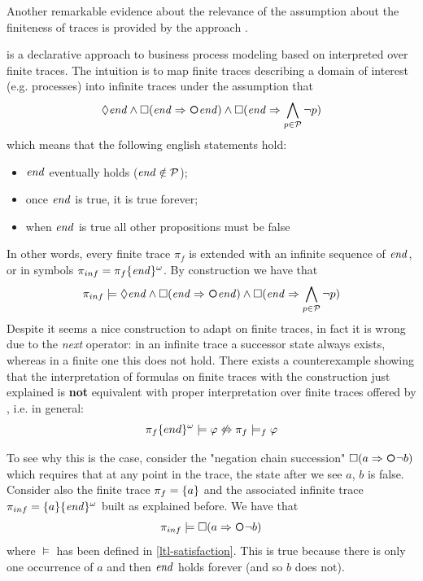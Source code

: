 \begin{example}
	Another remarkable evidence about the relevance of the assumption about the finiteness of traces is provided by the \DECLARE approach \citep{Pesic:2006:DAF:2135571.2135592}. 
	
	\DECLARE is a declarative approach to business process modeling based on \LTL interpreted over finite traces. The intuition is to map finite traces describing a domain of interest (e.g. processes) into infinite traces under the assumption that 
	\begin{equation}\label{declare-assumption}
	\Diamond \End \lAND \Box(\End \Rightarrow \Next \End) \lAND \Box (\End \Rightarrow \bigwedge_{p \in \Prop} \lnot p)
	\end{equation}
	which means that the following english statements hold:
	\begin{itemize}
		\item $\mathit{end}$ eventually holds ($\mathit{end} \notin \mathcal{P}$);
		\item once $\mathit{end}$ is true, it is true forever;
		\item when $\mathit{end}$ is true all other propositions must be false
	\end{itemize}
	In other words, every finite trace $\pi_f$ is extended with an infinite sequence of $\mathit{end}$, or in symbols $\pi_{inf} = \pi_f\{\mathit{end}\}^\omega$. By construction we have that 
	\begin{equation*}
	\pi_{inf} \models \Diamond \End \lAND \Box(\End \Rightarrow \Next \End) \lAND \Box (\End \Rightarrow \bigwedge_{p \in \Prop} \lnot p)
	\end{equation*}
	Despite it seems a nice construction to adapt \LTL on finite traces, in fact it is wrong due to the \emph{next} operator: in an infinite trace a successor state always exists, whereas in a finite one this does not hold.
	There exists a counterexample showing that the interpretation of \LTL formulas on finite traces with the construction just explained is \textbf{not} equivalent with proper interpretation over finite traces offered by \LTLf, i.e. in general:
	\begin{equation}
	\pi_f\{end\}^\omega \models \varphi \not\Leftrightarrow \pi_{f}\models_f \varphi
	\end{equation}
	
	To see why this is the case, consider the \DECLARE "negation chain succession" $\Box (a \Rightarrow \Next \lnot b)$ which requires that at any point in the trace, the state after we see $a$, $b$ is false. Consider also the finite trace $\pi_f = \{a\}$ and the associated infinite trace $\pi_{inf} = \{a\}\{\mathit{end}\}^\omega$ built as explained before. We have that
	\[
	\pi_{inf} \models \Box (a \Rightarrow \Next \lnot b)
	\]
	where $\models$ has been defined in \ref{ltl-satisfaction}. This is true because there is only one occurrence of $a$ and then $\mathit{end}$ holds forever (and so $b$ does not).
	

\end{example}
